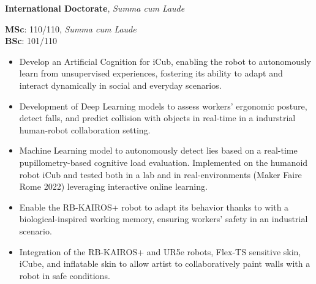 


  \textbf{International Doctorate}, \textit{Summa cum Laude}   
  
  
    \divider
    
  \textbf{MSc}: 110/110, \textit{Summa cum Laude}\\\textbf{BSc}: 101/110   
  
  

    \begin{itemize}
    \item Develop an Artificial Cognition for iCub, enabling the robot to autonomously learn from unsupervised experiences, fostering its ability to adapt and interact dynamically in social and everyday scenarios.
    \end{itemize}
    \smallskip
  
    \begin{itemize}
    \item Development of Deep Learning models to assess workers' ergonomic posture, detect falls, and predict collision with objects in real-time in a indurstrial human-robot collaboration setting.
    \end{itemize}
    \smallskip
  
    \begin{itemize}
    \item Machine Learning model to autonomously detect lies based on a real-time pupillometry-based cognitive load evaluation. Implemented on the humanoid robot iCub and tested both in a lab and in real-environments (Maker Faire Rome 2022) leveraging interactive online learning.
    \end{itemize}
    \smallskip
  
    \begin{itemize}
    \item Enable the RB-KAIROS+ robot to adapt its behavior thanks to with a biological-inspired working memory, ensuring workers' safety in an industrial scenario.
    \end{itemize}
    \smallskip
  
    \begin{itemize}
    \item Integration of the RB-KAIROS+ and UR5e robots, Flex-TS sensitive skin, iCube, and inflatable skin to allow artist to collaboratively paint walls with a robot in safe conditions.
    \end{itemize}
    \smallskip
  
  